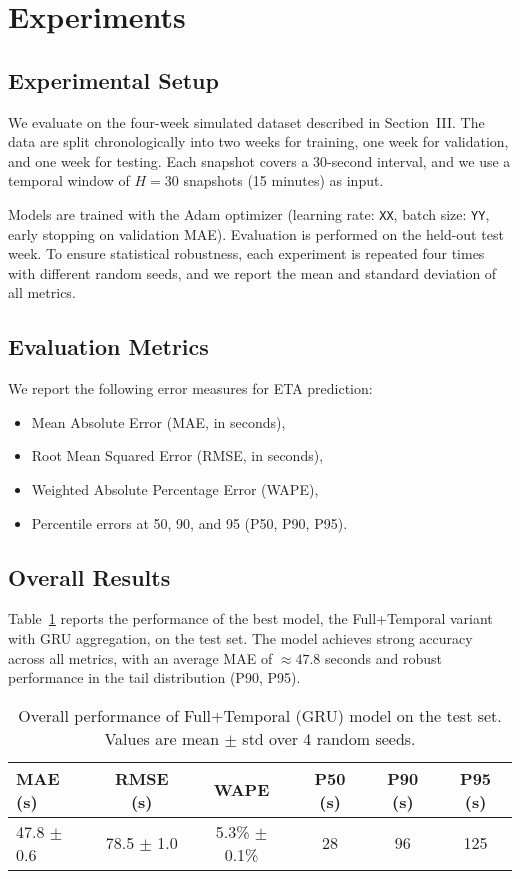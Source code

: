 \section{Experiments}

\subsection{Experimental Setup}
We evaluate on the four-week simulated dataset described in Section~III. 
The data are split chronologically into two weeks for training, one week for validation, and one week for testing. 
Each snapshot covers a 30-second interval, and we use a temporal window of $H=30$ snapshots (15 minutes) as input. 

Models are trained with the Adam optimizer (learning rate: \texttt{XX}, batch size: \texttt{YY}, early stopping on validation MAE). 
Evaluation is performed on the held-out test week. 
To ensure statistical robustness, each experiment is repeated four times with different random seeds, and we report the mean and standard deviation of all metrics.

\subsection{Evaluation Metrics}
We report the following error measures for ETA prediction:
\begin{itemize}
    \item Mean Absolute Error (MAE, in seconds),
    \item Root Mean Squared Error (RMSE, in seconds),
    \item Weighted Absolute Percentage Error (WAPE),
    \item Percentile errors at 50, 90, and 95 (P50, P90, P95).
\end{itemize}

\subsection{Overall Results}
Table~\ref{tab:overall-results} reports the performance of the best model, the Full+Temporal variant with GRU aggregation, on the test set. 
The model achieves strong accuracy across all metrics, with an average MAE of $\approx 47.8$ seconds and robust performance in the tail distribution (P90, P95). 

\begin{table}[t]
\centering
\caption{Overall performance of Full+Temporal (GRU) model on the test set. Values are mean $\pm$ std over 4 random seeds.}
\label{tab:overall-results}
\begin{tabular}{lccccc}
\toprule
MAE (s) & RMSE (s) & WAPE & P50 (s) & P90 (s) & P95 (s) \\
\midrule
47.8 $\pm$ 0.6 & 78.5 $\pm$ 1.0 & 5.3\% $\pm$ 0.1\% & 28 & 96 & 125 \\
\bottomrule
\end{tabular}
\end{table}

